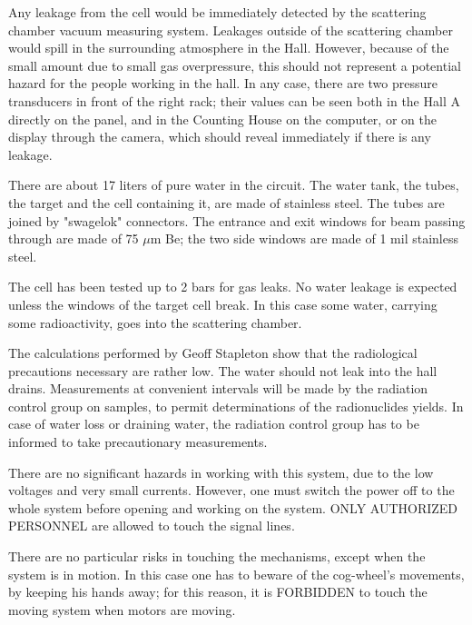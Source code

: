 Any leakage from  the cell would be immediately detected by the
scattering chamber vacuum  measuring system.
Leakages outside of the scattering chamber would spill in the surrounding
atmosphere in the Hall. However, because of the small amount due to
small gas overpressure, this should not represent
a potential hazard for the people working in the hall.
In any case, there are two pressure transducers in front of the right rack; 
their values can be seen both in the Hall A directly on the panel, 
and in the Counting House on the computer, or on the display through the 
camera, which should reveal immediately if there is any leakage. \\
 

There are about 17 liters of pure water in the circuit. 
The water tank, the tubes, 
the target and the cell containing it, are made 
of stainless steel. The tubes are joined by  "swagelok" connectors. 
The entrance and exit windows for beam passing through are made of 75 $\mu$m
Be; the  two side windows are made of 1 mil stainless steel. 

The cell has been 
tested up to 2 bars for gas leaks.
 No water leakage is expected unless the windows of the target
cell break. In this case some water, 
carrying some radioactivity, goes into the scattering chamber.

The calculations performed by Geoff Stapleton show that the
radiological precautions necessary are rather low. The water should not 
leak into the hall drains. Measurements at convenient intervals will 
be made by the radiation control group on samples, to permit 
determinations of the radionuclides yields. In case of water loss or 
draining water, the radiation control group has to be informed to
take precautionary measurements. 


There are no significant hazards in working with this system, 
due to the low voltages and very small currents.
However, one must switch the power off to
 the whole system before opening and working on the system.
ONLY AUTHORIZED PERSONNEL are allowed to touch the signal lines. \\


There are no particular risks in touching the mechanisms, 
except when the system
 is in motion. In this case one has to beware of the cog-wheel's movements,
 by keeping his  hands away; for this reason, it is FORBIDDEN to touch the
 moving system when motors are moving. \\


